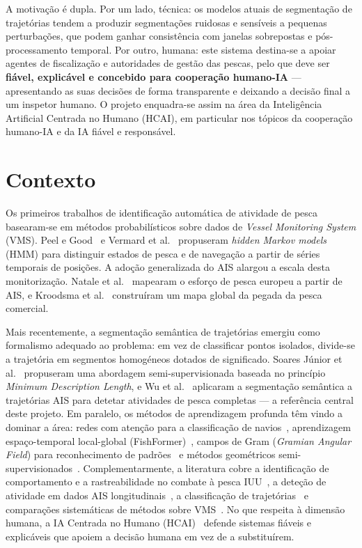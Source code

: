 \documentclass{article}
\begin{document}
A motiva\c{c}\~ao \'e dupla. Por um lado, t\'ecnica: os modelos atuais de
segmenta\c{c}\~ao de trajet\'orias tendem a produzir segmenta\c{c}\~oes ruidosas e
sens\'iveis a pequenas perturba\c{c}\~oes, que podem ganhar consist\^encia com janelas
sobrepostas e p\'os-processamento temporal. Por outro, humana: este sistema destina-se a apoiar
agentes de fiscaliza\c{c}\~ao e autoridades de gest\~ao das pescas, pelo que deve ser
\textbf{fi\'avel, explic\'avel e concebido para coopera\c{c}\~ao humano-IA} ---
apresentando as suas decis\~oes de forma transparente e deixando a decis\~ao final a um
inspetor humano. O projeto enquadra-se assim na \'area da Intelig\^encia Artificial
Centrada no Humano (HCAI), em particular nos t\'opicos da coopera\c{c}\~ao humano-IA e da
IA fi\'avel e respons\'avel.

\section{Contexto}
\label{sec:contexto}

Os primeiros trabalhos de identifica\c{c}\~ao autom\'atica de atividade de pesca
basearam-se em m\'etodos probabil\'isticos sobre dados de \emph{Vessel Monitoring
System} (VMS). Peel e Good~\cite{peel2011} e Vermard et al.~\cite{vermard2010}
propuseram \emph{hidden Markov models} (HMM) para distinguir estados de pesca e de
navega\c{c}\~ao a partir de s\'eries temporais de posi\c{c}\~oes. A ado\c{c}\~ao
generalizada do AIS alargou a escala desta monitoriza\c{c}\~ao. Natale et
al.~\cite{natale2015} mapearam o esfor\c{c}o de pesca europeu a partir de AIS, e
Kroodsma et al.~\cite{kroodsma2018} constru\'iram um mapa global da pegada da pesca
comercial.

Mais recentemente, a segmenta\c{c}\~ao sem\^antica de trajet\'orias emergiu como
formalismo adequado ao problema: em vez de classificar pontos isolados, divide-se a
trajet\'oria em segmentos homog\'eneos dotados de significado. Soares J\'unior et
al.~\cite{soares2018} propuseram uma abordagem semi-supervisionada baseada no princ\'ipio
\emph{Minimum Description Length}, e Wu et al.~\cite{wu2022} aplicaram a
segmenta\c{c}\~ao sem\^antica a trajet\'orias AIS para detetar atividades de pesca
completas --- a refer\^encia central deste projeto. Em paralelo, os m\'etodos de
aprendizagem profunda t\^em vindo a dominar a \'area: redes com aten\c{c}\~ao para a
classifica\c{c}\~ao de navios~\cite{cheng2025}, aprendizagem espa\c{c}o-temporal
local-global (FishFormer)~\cite{wang2026}, campos de Gram (\emph{Gramian Angular
Field}) para reconhecimento de padr\~oes~\cite{hu2026} e m\'etodos geom\'etricos
semi-supervisionados~\cite{ferreira2022}. Complementarmente, a literatura cobre a
identifica\c{c}\~ao de comportamento e a rastreabilidade no combate \`a pesca
IUU~\cite{chuaysi2020}, a dete\c{c}\~ao de atividade em dados AIS
longitudinais~\cite{arasteh2020}, a classifica\c{c}\~ao de
trajet\'orias~\cite{luo2023,xing2023} e compara\c{c}\~oes sistem\'aticas de m\'etodos
sobre VMS~\cite{guillot2018,ghazizadeh2019}.
 No que respeita \`a dimens\~ao humana, a IA Centrada no Humano (HCAI)~\cite{shneiderman2020}
 defende sistemas fi\'aveis e explic\'aveis que apoiem a decis\~ao humana em vez de a
 substitu\'irem.
\end{document}
